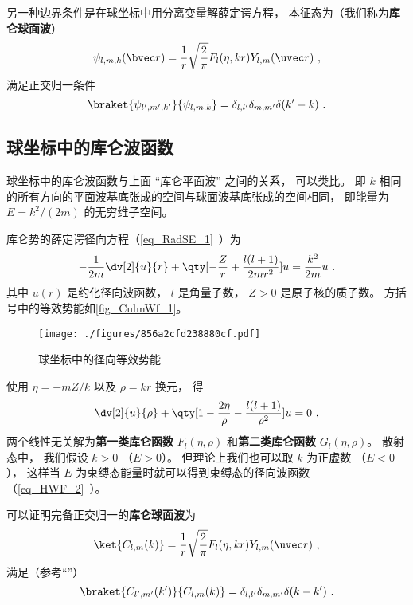 另一种边界条件是在球坐标中用分离变量解薛定谔方程， 本征态为（我们称为\textbf{库仑球面波}）
\begin{equation}\label{eq_CulmWf_11}
\psi_{l,m,k}(\bvec r) = \frac{1}{r} \sqrt{\frac{2}{\pi}} F_l(\eta, kr) Y_{l,m}(\uvec r)~,
\end{equation}
满足正交归一条件
\begin{equation}
\braket{\psi_{l',m',k'}}{\psi_{l,m,k}} = \delta_{l,l'}\delta_{m,m'} \delta(k'-k)~.
\end{equation}

\subsection{球坐标中的库仑波函数}
球坐标中的库仑波函数与上面 “库仑平面波” 之间的关系， 可以类比。 即 $k$ 相同的所有方向的平面波基底张成的空间与球面波基底张成的空间相同， 即能量为 $E = k^2/(2m)$ 的无穷维子空间。

库仑势的薛定谔径向方程（\autoref{eq_RadSE_1}~）为
\begin{equation}\label{eq_CulmWf_5}
-\frac{1}{2m} \dv[2]{u}{r} + \qty[-\frac{Z}{r} + \frac{l(l+1)}{2mr^2}]u = \frac{k^2}{2m}u~.
\end{equation}
其中 $u(r)$ 是约化径向波函数， $l$ 是角量子数， $Z > 0$ 是原子核的质子数。 方括号中的等效势能如\autoref{fig_CulmWf_1}。
\begin{figure}[ht]
\centering
\texttt{[image: ./figures/856a2cfd238880cf.pdf]}
\caption{球坐标中的径向等效势能} \label{fig_CulmWf_1}
\end{figure}
使用 $\eta = -mZ/k$ 以及 $\rho = kr$ 换元， 得
\begin{equation}
\dv[2]{u}{\rho} + \qty[1 - \frac{2\eta}{\rho} - \frac{l(l+1)}{\rho^2}]u = 0~,
\end{equation}
两个线性无关解为\textbf{第一类库仑函数} $F_l(\eta, \rho)$ 和\textbf{第二类库仑函数} $G_l(\eta, \rho)$。 散射态中， 我们假设 $k > 0$ （$E > 0$）。 但理论上我们也可以取 $k$ 为正虚数 （$E < 0$）， 这样当 $E$ 为束缚态能量时就可以得到束缚态的径向波函数（\autoref{eq_HWF_2}~）。

可以证明完备正交归一的\textbf{库仑球面波}为
\begin{equation}\label{eq_CulmWf_1}
\ket{C_{l,m}(k)} = \frac{1}{r} \sqrt{\frac{2}{\pi}} F_l(\eta, kr) Y_{l,m}(\uvec r)~,
\end{equation}
满足（参考“”）
\begin{equation}\label{eq_CulmWf_2}
\braket{C_{l',m'}(k')}{C_{l,m}(k)} = \delta_{l,l'}\delta_{m,m'}\delta(k-k')~.
\end{equation}

